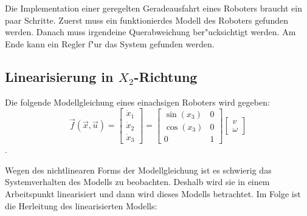 Die Implementation einer geregelten Geradeausfahrt eines Roboters braucht ein paar Schritte. Zuerst muss ein funktionierdes Modell des Roboters gefunden werden. Danach muss irgendeine Querabweichung ber"ucksichtigt werden. Am Ende kann ein Regler f"ur das System gefunden werden. 

\subsection{Linearisierung in $X_2$-Richtung}

Die folgende Modellgleichung eines einachsigen Roboters wird gegeben:
\begin{equation} \label{eq:model}
    \overrightarrow{f}(\overrightarrow{x}, \overrightarrow{u}) =
    \begin{bmatrix*}
        \dot{x}_1 \\
        \dot{x}_2 \\
        \dot{x}_3
    \end{bmatrix*}
    =
    \begin{bmatrix*}
        \sin(x_3) & 0 \\
        \cos(x_3) & 0 \\
        0 & 1
    \end{bmatrix*}
    \begin{bmatrix*}
        v \\
        \omega
    \end{bmatrix*}
\end{equation}.

Wegen des nichtlinearen Forms der Modellgleichung ist es schwierig das Systemverhalten des Modells zu beobachten. Deshalb wird sie in einem Arbeitspunkt linearisiert und dann wird dieses Modells betrachtet. Im Folge ist die Herleitung des linearisierten Modells:

